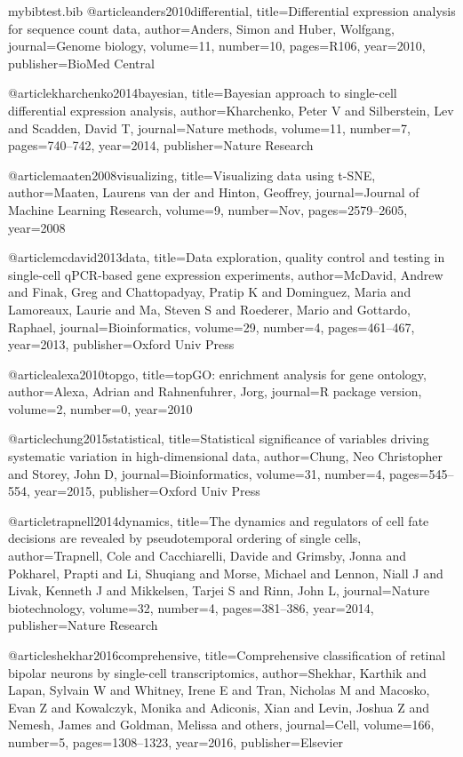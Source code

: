 \begin{filecontents}{mybibtest.bib}
@article{anders2010differential,
  title={Differential expression analysis for sequence count data},
  author={Anders, Simon and Huber, Wolfgang},
  journal={Genome biology},
  volume={11},
  number={10},
  pages={R106},
  year={2010},
  publisher={BioMed Central}
}

@article{kharchenko2014bayesian,
  title={Bayesian approach to single-cell differential expression analysis},
  author={Kharchenko, Peter V and Silberstein, Lev and Scadden, David T},
  journal={Nature methods},
  volume={11},
  number={7},
  pages={740--742},
  year={2014},
  publisher={Nature Research}
}

@article{maaten2008visualizing,
  title={Visualizing data using t-SNE},
  author={Maaten, Laurens van der and Hinton, Geoffrey},
  journal={Journal of Machine Learning Research},
  volume={9},
  number={Nov},
  pages={2579--2605},
  year={2008}
}

@article{mcdavid2013data,
  title={Data exploration, quality control and testing in single-cell qPCR-based gene expression experiments},
  author={McDavid, Andrew and Finak, Greg and Chattopadyay, Pratip K and Dominguez, Maria and Lamoreaux, Laurie and Ma, Steven S and Roederer, Mario and Gottardo, Raphael},
  journal={Bioinformatics},
  volume={29},
  number={4},
  pages={461--467},
  year={2013},
  publisher={Oxford Univ Press}
}

@article{alexa2010topgo,
  title={topGO: enrichment analysis for gene ontology},
  author={Alexa, Adrian and Rahnenfuhrer, Jorg},
  journal={R package version},
  volume={2},
  number={0},
  year={2010}
}	

@article{chung2015statistical,
  title={Statistical significance of variables driving systematic variation in high-dimensional data},
  author={Chung, Neo Christopher and Storey, John D},
  journal={Bioinformatics},
  volume={31},
  number={4},
  pages={545--554},
  year={2015},
  publisher={Oxford Univ Press}
}

@article{trapnell2014dynamics,
  title={The dynamics and regulators of cell fate decisions are revealed by pseudotemporal ordering of single cells},
  author={Trapnell, Cole and Cacchiarelli, Davide and Grimsby, Jonna and Pokharel, Prapti and Li, Shuqiang and Morse, Michael and Lennon, Niall J and Livak, Kenneth J and Mikkelsen, Tarjei S and Rinn, John L},
  journal={Nature biotechnology},
  volume={32},
  number={4},
  pages={381--386},
  year={2014},
  publisher={Nature Research}
}

@article{shekhar2016comprehensive,
  title={Comprehensive classification of retinal bipolar neurons by single-cell transcriptomics},
  author={Shekhar, Karthik and Lapan, Sylvain W and Whitney, Irene E and Tran, Nicholas M and Macosko, Evan Z and Kowalczyk, Monika and Adiconis, Xian and Levin, Joshua Z and Nemesh, James and Goldman, Melissa and others},
  journal={Cell},
  volume={166},
  number={5},
  pages={1308--1323},
  year={2016},
  publisher={Elsevier}
}


\end{filecontents}
